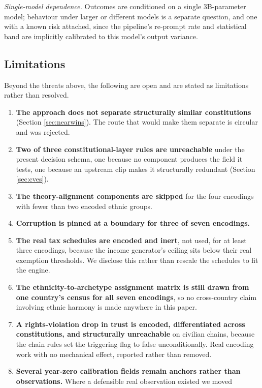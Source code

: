 \documentclass{ieeeaccess}
\begin{document}
\emph{Single-model dependence.} Outcomes are conditioned on a single
3B-parameter model; behaviour under larger or different models is a
separate question, and one with a known risk attached, since the
pipeline's re-prompt rate and statistical band are implicitly calibrated
to this model's output variance.

\subsection{Limitations}
\label{sec:limitations}
Beyond the threats above, the following are open and are stated as
limitations rather than resolved.

\begin{enumerate}
\item \textbf{The approach does not separate structurally similar
constitutions} (Section \ref{sec:nearwins}). The route that would make
them separate is circular and was rejected.
\item \textbf{Two of three constitutional-layer rules are unreachable}
under the present decision schema, one because no component produces the
field it tests, one because an upstream clip makes it structurally
redundant (Section \ref{sec:cves}).
\item \textbf{The theory-alignment components are skipped} for the four
encodings with fewer than two encoded ethnic groups.
\item \textbf{Corruption is pinned at a boundary for three of seven
encodings.}
\item \textbf{The real tax schedules are encoded and inert}, not used,
for at least three encodings, because the income generator's ceiling
sits below their real exemption thresholds. We disclose this rather than
rescale the schedules to fit the engine.
\item \textbf{The ethnicity-to-archetype assignment matrix is still
drawn from one country's census for all seven encodings}, so no
cross-country claim involving ethnic harmony is made anywhere in this
paper.
\item \textbf{A rights-violation drop in trust is encoded, differentiated
across constitutions, and structurally unreachable} on civilian chains,
because the chain rules set the triggering flag to false
unconditionally. Real encoding work with no mechanical effect, reported
rather than removed.
\item \textbf{Several year-zero calibration fields remain anchors rather
than observations.} Where a defensible real observation existed we moved

\end{enumerate}
\end{document}
